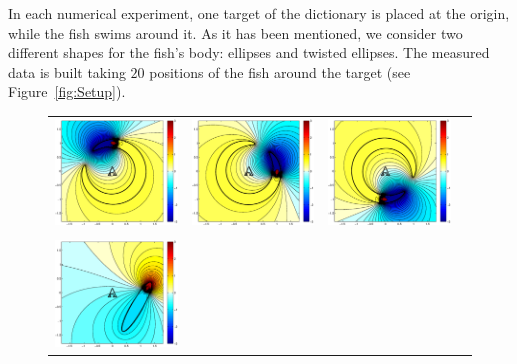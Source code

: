 In each numerical experiment, one target of the dictionary is
placed at the origin, while the fish swims around it. As it has
been mentioned, we consider two different shapes for the fish's
body: ellipses and twisted ellipses. The measured data is built
taking $20$ positions of the fish around the target (see
Figure~\ref{fig:Setup}).
\begin{figure}[!h]
\centering%
\begin{tabular}{cccc}
\includegraphics[width=5cm]{pnas/banana2} & \includegraphics[width=5cm]{pnas/banana3} &\includegraphics[width=5cm]{pnas/banana4}
\\ \tabularnewline
\includegraphics[width=5cm]{pnas/ellipse2} &

\end{tabular}
\end{figure}
